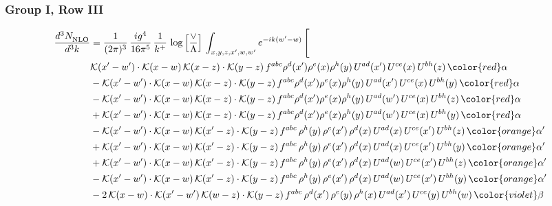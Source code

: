\subsubsection{Group I, Row III}
\begin{align}
    \frac{d^{3}N_{\rm NLO}^{\rm}}{d^{3}k}  & = \frac{1}{(2\pi)^{3}}\, \frac{ig^{4}}{16\pi^{5}}\, \frac{1}{k^{+}}\, \log{\left[\frac{\vee}{\Lambda}\right]}\, \int_{x,y,z,x^{\prime},w,w^{\prime}}e^{-ik(w^{\prime}-w)}\, \Bigg[\notag \\ & \mathcal{K}(x'-w')\cdot \mathcal{K}(x-w)\, \mathcal{K}(x-z)\cdot \mathcal{K}(y-z)\, f^{abc}\rho^{d}(x')\rho^{e}(x)\rho^{h}(y)\, U^{ad}(x')\,U^{ce}(x)\, U^{bh}(z)\,{\color{red} \alpha}\notag\\ & - \mathcal{K}(x'-w')\cdot \mathcal{K}(x-w)\, \mathcal{K}(x-z)\cdot \mathcal{K}(y-z)\, f^{abc}\rho^{d}(x')\rho^{e}(x)\rho^{h}(y)\, U^{ad}(x')\,U^{ce}(x)\, U^{bh}(y)\,{\color{red} \alpha}\notag \\ &-\mathcal{K}(x'-w')\cdot \mathcal{K}(x-w)\, \mathcal{K}(x-z)\cdot \mathcal{K}(y-z)\, f^{abc}\rho^{d}(x')\rho^{e}(x)\rho^{h}(y)\, U^{ad}(w')\,U^{ce}(x)\, U^{bh}(z)\,{\color{red} \alpha}\notag \\ & +\mathcal{K}(x'-w')\cdot \mathcal{K}(x-w)\, \mathcal{K}(x-z)\cdot \mathcal{K}(y-z)\, f^{abc}\rho^{d}(x')\rho^{e}(x)\rho^{h}(y)\, U^{ad}(w')\,U^{ce}(x)\, U^{bh}(y)\,{\color{red} \alpha}\notag \\ & -\mathcal{K}(x'-w')\cdot\mathcal{K}(x-w)\,\mathcal{K}(x'-z)\cdot\mathcal{K}(y-z)\, f^{abc}\,\rho^{h}(y)\,\rho^{e}(x')\,\rho^{d}(x)\,U^{ad}(x)\,U^{ce}(x')\,U^{bh}(z)\,{\color{orange} \alpha'}\notag \\ &+\mathcal{K}(x'-w')\cdot\mathcal{K}(x-w)\,\mathcal{K}(x'-z)\cdot\mathcal{K}(y-z)\, f^{abc}\,\rho^{h}(y)\,\rho^{e}(x')\,\rho^{d}(x)\,U^{ad}(x)\,U^{ce}(x')\,U^{bh}(y)\,{\color{orange} \alpha'}\notag \\ & +\mathcal{K}(x'-w')\cdot\mathcal{K}(x-w)\,\mathcal{K}(x'-z)\cdot\mathcal{K}(y-z)\, f^{abc}\,\rho^{h}(y)\,\rho^{e}(x')\,\rho^{d}(x)\,U^{ad}(w)\,U^{ce}(x')\,U^{bh}(z)\,{\color{orange} \alpha'}\notag \\ & -\mathcal{K}(x'-w')\cdot\mathcal{K}(x-w)\,\mathcal{K}(x'-z)\cdot\mathcal{K}(y-z)\, f^{abc}\,\rho^{h}(y)\,\rho^{e}(x')\,\rho^{d}(x)\,U^{ad}(w)\,U^{ce}(x')\,U^{bh}(y)\,{\color{orange} \alpha'}\notag \\ & -2\,\mathcal{K}(x-w)\cdot\mathcal{K}(x'-w')\,\mathcal{K}(w-z)\cdot\mathcal{K}(y-z)\, f^{abc}\,\rho^{d}(x')\,\rho^{e}(y)\,\rho^{h}(x)\,U^{ad}(x')\,U^{ce}(y)\,U^{bh}(w)\,{\color{violet} \beta}\notag\\

\end{align}
